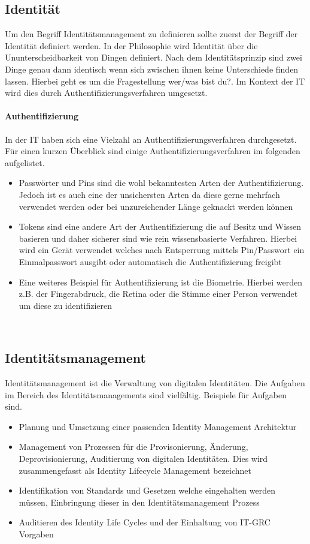 \documentclass[10pt]{article}
\begin{document}
\subsection{Identität}
Um den Begriff Identitätsmanagement zu definieren sollte zuerst der Begriff der Identität definiert werden. In der Philosophie wird Identität über die Ununterscheidbarkeit von Dingen definiert. Nach dem Identitätsprinzip sind zwei Dinge genau dann identisch wenn sich zwischen ihnen keine Unterschiede finden lassen. Hierbei geht es um die Fragestellung \glqq{}wer/was bist du?\grqq{}. Im Kontext der IT wird dies durch Authentifizierungsverfahren umgesetzt.
\paragraph{Authentifizierung}
In der IT haben sich eine Vielzahl an Authentifizierungsverfahren durchgesetzt. Für einen kurzen Überblick sind einige Authentifizierungsverfahren im folgenden aufgelistet.
\begin{itemize}
  \item Passwörter und Pins sind die wohl bekanntesten Arten der Authentifizierung. Jedoch ist es auch eine der unsichersten Arten da diese gerne mehrfach verwendet werden oder bei unzureichender Länge geknackt werden können
  \item Tokens sind eine andere Art der Authentifizierung die auf Besitz und Wissen basieren und daher sicherer sind wie rein wissensbasierte Verfahren. Hierbei wird ein Gerät verwendet welches nach Entsperrung mittels Pin/Passwort ein Einmalpasswort ausgibt oder automatisch die Authentifizierung freigibt
  \item Eine weiteres Beispiel für Authentifizierung ist die Biometrie. Hierbei werden z.B. der Fingerabdruck, die Retina oder die Stimme einer Person verwendet um diese zu identifizieren
\end{itemize}
~\cite{tsolkas2017}
\subsection{Identitätsmanagement}
Identitätsmanagement ist die Verwaltung von digitalen Identitäten. Die Aufgaben im Bereich des Identitätsmanagements sind vielfältig. Beispiele für Aufgaben sind.
\begin{itemize}
  \item Planung und Umsetzung einer passenden Identity Management Architektur~\cite{windley2005digital}
  \item Management von Prozessen für die Provisonierung, Änderung, Deprovisionierung, Auditierung von digitalen Identitäten. Dies wird zusammengefasst als Identity Lifecycle Management bezeichnet~\cite{sharma2016identity}
  \item Identifikation von Standards und Gesetzen welche eingehalten werden müssen, Einbringung dieser in den Identitätsmanagement Prozess~\cite{azhar2014economics}
  \item Auditieren des Identity Life Cycles und der Einhaltung von IT-GRC Vorgaben~\cite{peyton2007audit}~\cite{accorsi2008automated}
\end{itemize}
\end{document}
